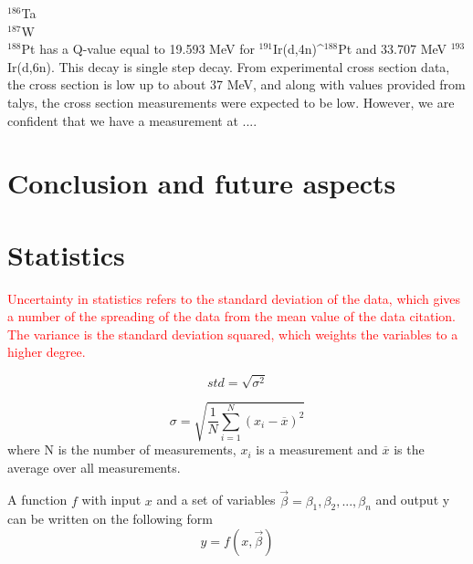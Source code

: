 \documentclass[a4paper,11pt,twoside]{book}
\begin{document}
\noindent $^{186}$Ta \\

\noindent $^{187}$W  \\

\noindent $^{188}$Pt has a Q-value equal to 19.593 MeV for $^{191}$Ir(d,4n)^$^{188}$Pt and 33.707 MeV $^{193}$Ir(d,6n). This decay is single step decay.  From experimental cross section data, the cross section is low up to about 37 MeV, and along with values provided from talys, the cross section measurements were expected to be low. However, we are confident that we have a measurement at .... 

\noindent 


\chapter{Conclusion and future aspects}\label{Chapter:Conclusion}
\noindent









\appendix 

\chapter{Statistics} \label{ch_app:statistics}

\noindent \textcolor{red}{Uncertainty in statistics refers to the standard deviation of the data, which gives a number of the spreading of the data from the mean value of the data \textcolor{red}{citation}. The variance is the standard deviation squared, which weights the variables to a higher degree. }

\begin{equation}
    std = \sqrt{\sigma^2}
\end{equation}

\begin{equation}
    \sigma = \sqrt{\frac{1}{N}\sum_{i=1}^N (x_i - \overline{x})^2}
\end{equation}
\noindent
where N is the number of measurements, $x_i$ is a measurement and $\overline{x}$ is the average over all measurements. 


\noindent 
A function $f$ with input $x$ and a set of variables $\vec{\beta}= \beta_1, \beta_2, ..., \beta_n$ and output y can be written on the following form
\begin{equation}
    y = f(x, \vec{\beta})
\end{equation}
\end{document}
